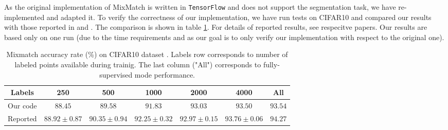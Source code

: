 As the original implementation of MixMatch is written in \texttt{TensorFlow} and does not support the segmentation task, we have re-implemented
and adapted it. To verify the correctness of our implementation, we have run tests on CIFAR10 and compared our results with those reported in \cite{mixmatch-2019} and \cite{wide-resnet-2017}. The 
comparison is shown in table \ref{tab:mixmatch-cifar10}. For details of reported results, see respecitve papers. Our results are based only on one run (due to the time requirements and as our goal
is to only verify our implementation with respect to the original one). 
\begin{table}[htb]
    \begin{tabular}{|c|c|c|c|c|c|c|}
    \hline
    Labels  & 250 & 500 & 1000 & 2000 & 4000 & All \\
    \hline
    Our code & $88.45$ & $89.58$& $91.83$ & $93.03$ & $93.50$ & $93.54$\\
    \hline
    Reported & $88.92\pm0.87$ & $90.35\pm0.94$ & $92.25\pm0.32$ & $92.97\pm0.15$ & $93.76\pm 0.06$ & $94.27$\\
    \hline
    \end{tabular}
    \caption[Mixmatch accuracy on CIFAR10]{Mixmatch accuracy rate (\%) on CIFAR10 dataset \cite{cifar10-2009}. Labels row corresponds to number of labeled points available during trainig. 
    The last column ("All") corresponds to fully-supervised mode performance.}
    \label{tab:mixmatch-cifar10}
\end{table}
     